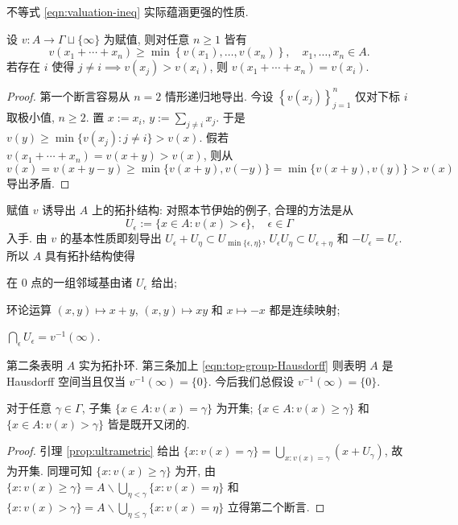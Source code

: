 不等式 \eqref{eqn:valuation-ineq} 实际蕴涵更强的性质.
\begin{lemma}\label{prop:ultrametric}
	设 $v: A \to \Gamma \sqcup \{\infty\}$ 为赋值, 则对任意 $n \geq 1$ 皆有
	\[ v(x_1 + \cdots + x_n) \geq \min\left\{ v(x_1), \ldots, v(x_n)  \right\}, \quad x_1, \ldots, x_n \in A. \]
	若存在 $i$ 使得 $j \neq i \implies v(x_j) > v(x_i)$, 则 $v(x_1 + \cdots + x_n) = v(x_i)$.
\end{lemma}
\begin{proof}
	第一个断言容易从 $n=2$ 情形递归地导出. 今设 $\left\{v(x_j)\right\}_{j=1}^n$ 仅对下标 $i$ 取极小值, $n \geq 2$. 置 $x := x_i$, $y := \sum_{j \neq i} x_j$. 于是 $v(y) \geq \min\{ v(x_j) : j \neq i \} > v(x)$. 假若 $v(x_1 + \cdots + x_n) = v(x+y) > v(x)$, 则从
	\[ v(x) = v(x+y-y) \geq \min\{v(x+y), v(-y) \} = \min\{ v(x+y), v(y) \} > v(x) \]
	导出矛盾.
\end{proof}

赋值 $v$ 诱导出 $A$ 上的拓扑结构: 对照本节伊始的例子, 合理的方法是从
\[ U_\epsilon := \{x \in A: v(x) > \epsilon \}, \quad \epsilon \in \Gamma \]
入手. 由 $v$ 的基本性质即刻导出 $U_\epsilon + U_\eta \subset U_{\min\{\epsilon, \eta\}}$, $U_\epsilon U_\eta \subset U_{\epsilon+\eta}$ 和 $-U_\epsilon = U_\epsilon$. 所以 $A$ 具有拓扑结构使得
\begin{compactitem}
	\item 在 $0$ 点的一组邻域基由诸 $U_\epsilon$ 给出;
	\item 环论运算 $(x,y) \mapsto x+y$, $(x,y) \mapsto xy$ 和 $x \mapsto -x$ 都是连续映射;
	\item $\bigcap_\epsilon U_\epsilon = v^{-1}(\infty)$.
\end{compactitem}
第二条表明 $A$ 实为拓扑环. 第三条加上 \eqref{eqn:top-group-Hausdorff} 则表明 $A$ 是 Hausdorff 空间当且仅当 $v^{-1}(\infty) = \{0\}$. 今后我们总假设 $v^{-1}(\infty) = \{0\}$.

\begin{lemma}\label{prop:valuation-openness}
	对于任意 $\gamma \in \Gamma$, 子集 $\{x \in A: v(x) = \gamma\}$ 为开集; $\{x \in A : v(x) \geq \gamma\}$ 和 $\{x \in A: v(x) > \gamma\}$ 皆是既开又闭的.
\end{lemma}
\begin{proof}
	引理 \ref{prop:ultrametric} 给出 $\{x: v(x) = \gamma\} = \bigcup_{x: v(x) = \gamma} (x + U_\gamma)$, 故为开集. 同理可知 $\{x: v(x) \geq \gamma\}$ 为开, 由 $\{ x : v(x) \geq \gamma \} = A \smallsetminus \bigcup_{\eta < \gamma} \{ x : v(x) = \eta \}$ 和 $\{ x : v(x) > \gamma \} = A \smallsetminus \bigcup_{\eta \leq \gamma} \{ x : v(x) = \eta \}$ 立得第二个断言.
\end{proof}

